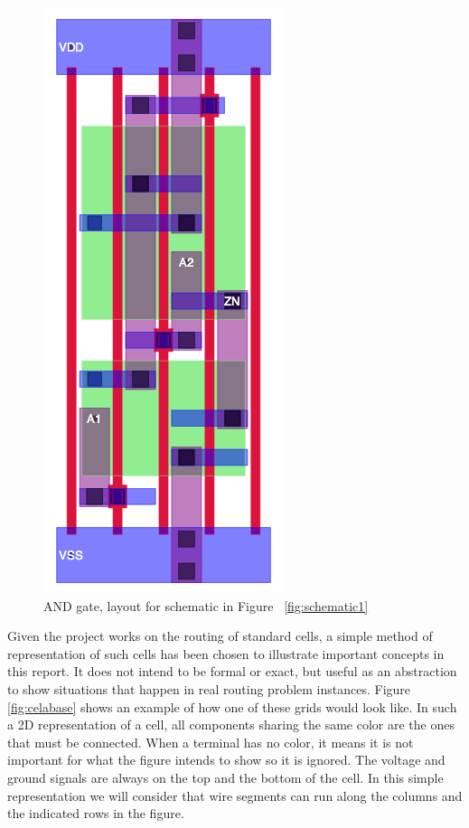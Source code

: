 \begin{description}
\begin{figure}[h!]
  \centering
  \includegraphics[scale=0.4]{img/bckgrnd/ANDlayout.png}
  \caption{AND gate, layout for schematic in Figure ~\ref{fig:schematic1} }
  \label{fig:layout1}
\end{figure}

\end{description}


Given the project works on the routing of standard cells, a simple method of representation of such cells has been chosen to illustrate important concepts in this report. It does not intend to be formal or exact, but useful as an abstraction to show situations that happen in real routing problem instances. Figure \ref{fig:celabase} shows an example of how one of these grids would look like. In such a 2D representation of a cell, all components sharing the same color are the ones that must be connected. When a terminal has no color, it means it is not important for what the figure intends to show so it is ignored. The voltage and ground signals are always on the top and the bottom of the cell. In this simple representation we will consider that wire segments can run along the columns and the indicated rows in the figure. 

